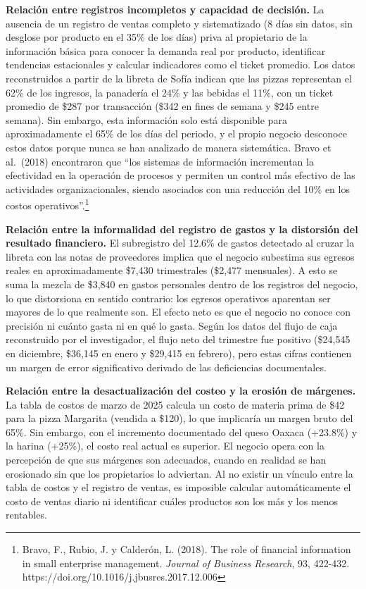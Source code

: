 \documentclass[
  12pt,
  spanish,
]{article}
\begin{document}
\textbf{Relación entre registros incompletos y capacidad de decisión.}
La ausencia de un registro de ventas completo y sistematizado (8 días
sin datos, sin desglose por producto en el 35\% de los días) priva al
propietario de la información básica para conocer la demanda real por
producto, identificar tendencias estacionales y calcular indicadores
como el ticket promedio. Los datos reconstruidos a partir de la libreta
de Sofía indican que las pizzas representan el 62\% de los ingresos, la
panadería el 24\% y las bebidas el 11\%, con un ticket promedio de \$287
por transacción (\$342 en fines de semana y \$245 entre semana). Sin
embargo, esta información solo está disponible para aproximadamente el
65\% de los días del periodo, y el propio negocio desconoce estos datos
porque nunca se han analizado de manera sistemática. Bravo et al.~(2018)
encontraron que ``los sistemas de información incrementan la efectividad
en la operación de procesos y permiten un control más efectivo de las
actividades organizacionales, siendo asociados con una reducción del
10\% en los costos operativos''.\footnote{Bravo, F., Rubio, J. y
  Calderón, L. (2018). The role of financial information in small
  enterprise management. \emph{Journal of Business Research}, 93,
  422-432. https://doi.org/10.1016/j.jbusres.2017.12.006}

\textbf{Relación entre la informalidad del registro de gastos y la
distorsión del resultado financiero.} El subregistro del 12.6\% de
gastos detectado al cruzar la libreta con las notas de proveedores
implica que el negocio subestima sus egresos reales en aproximadamente
\$7,430 trimestrales (\$2,477 mensuales). A esto se suma la mezcla de
\$3,840 en gastos personales dentro de los registros del negocio, lo que
distorsiona en sentido contrario: los egresos operativos aparentan ser
mayores de lo que realmente son. El efecto neto es que el negocio no
conoce con precisión ni cuánto gasta ni en qué lo gasta. Según los datos
del flujo de caja reconstruido por el investigador, el flujo neto del
trimestre fue positivo (\$24,545 en diciembre, \$36,145 en enero y
\$29,415 en febrero), pero estas cifras contienen un margen de error
significativo derivado de las deficiencias documentales.

\textbf{Relación entre la desactualización del costeo y la erosión de
márgenes.} La tabla de costos de marzo de 2025 calcula un costo de
materia prima de \$42 para la pizza Margarita (vendida a \$120), lo que
implicaría un margen bruto del 65\%. Sin embargo, con el incremento
documentado del queso Oaxaca (+23.8\%) y la harina (+25\%), el costo
real actual es superior. El negocio opera con la percepción de que sus
márgenes son adecuados, cuando en realidad se han erosionado sin que los
propietarios lo adviertan. Al no existir un vínculo entre la tabla de
costos y el registro de ventas, es imposible calcular automáticamente el
costo de ventas diario ni identificar cuáles productos son los más y los
menos rentables.
\end{document}
